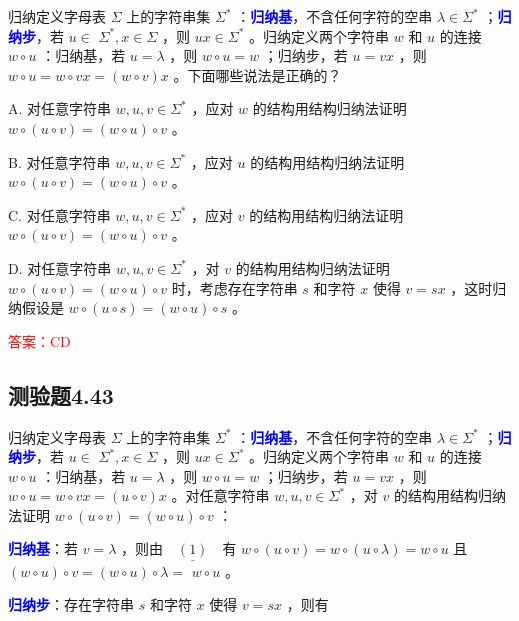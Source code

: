 \documentclass[UTF8, heading=true]{ctexart}
\begin{document}
归纳定义字母表 $\Sigma$ 上的字符串集 $\Sigma^*$ ：\textcolor{blue}{\textbf{归纳基}}，不含任何字符的空串 $\lambda \in \Sigma^*$ ；\textcolor{blue}{\textbf{归纳步}}，若 $u \in$ $\Sigma^*, x \in \Sigma$ ，则 $u x \in \Sigma^*$ 。归纳定义两个字符串 $w$ 和 $u$ 的连接 $w \circ u$ ：归纳基，若 $u=\lambda$ ，则 $w \circ u=w$ ；归纳步，若 $u=v x$ ，则 $w \circ u=w \circ v x=(w \circ v) x$ 。下面哪些说法是正确的？

A. 对任意字符串 $w, u, v \in \Sigma^*$ ，应对 $w$ 的结构用结构归纳法证明 $w \circ(u \circ v)=(w \circ u) \circ v$ 。

B. 对任意字符串 $w, u, v \in \Sigma^*$ ，应对 $u$ 的结构用结构归纳法证明 $w \circ(u \circ v)=(w \circ u) \circ v$ 。

C. 对任意字符串 $w, u, v \in \Sigma^*$ ，应对 $v$ 的结构用结构归纳法证明 $w \circ(u \circ v)=(w \circ u) \circ v$ 。

D. 
对任意字符串 $w, u, v \in \Sigma^*$ ，对 $v$ 的结构用结构归纳法证明 $w \circ(u \circ v)=(w \circ u) \circ v$ 时，考虑存在字符串 $s$ 和字符 $x$ 使得 $v=s x$ ，这时归纳假设是 $w \circ(u \circ s)=(w \circ u) \circ s$ 。


\textcolor{red}{答案：CD}

\subsection{测验题4.43}

归纳定义字母表 $\Sigma$ 上的字符串集 $\Sigma^*$ ：\textcolor{blue}{\textbf{归纳基}}，不含任何字符的空串 $\lambda \in \Sigma^*$ ；\textcolor{blue}{\textbf{归纳步}}，若 $u \in$ $\Sigma^*, x \in \Sigma$ ，则 $u x \in \Sigma^*$ 。归纳定义两个字符串 $w$ 和 $u$ 的连接 $w \circ u$ ：归纳基，若 $u=\lambda$ ，则 $w \circ u=w$ ；归纳步，若 $u=v x$ ，则 $w \circ u=w \circ v x=(u \circ v) x$ 。对任意字符串 $w, u, v \in \Sigma^*$ ，对 $v$ 的结构用结构归纳法证明 $w \circ(u \circ v)=(w \circ u) \circ v$ ：

\textcolor{blue}{\textbf{归纳基}}：若 $v=\lambda$ ，则由$\underline{\quad(1)\quad}$有 $w \circ(u \circ v)=w \circ(u \circ \lambda)=w \circ u$ 且 $(w \circ u) \circ v=(w \circ u) \circ \lambda=$ $w \circ u$ 。

\textcolor{blue}{\textbf{归纳步}}：存在字符串 $s$ 和字符 $x$ 使得 $v=s x$ ，则有
\end{document}
